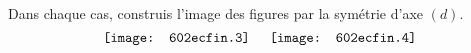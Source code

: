 Dans chaque cas, construis l'image des figures par la symétrie d'axe
$(d)$.
\[\texttt{[image: 602ecfin.3]}\kern5mm\texttt{[image: 602ecfin.4]}\]